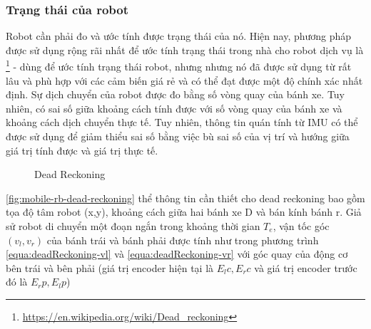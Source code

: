 {\subsubsection*{Trạng thái của robot}
Robot cần phải đo và ước tính được trạng thái của nó. Hiện nay, phương pháp được sử dụng rộng rãi nhất để ước tính trạng thái trong nhà cho robot dịch vụ là \footnote{\url{https://en.wikipedia.org/wiki/Dead_reckoning}} - dùng để ước tính trạng thái robot, nhưng nhưng nó đã được sử dụng từ rất lâu và phù hợp với các cảm biến giá rẻ và có thể đạt được một độ chính xác nhất định. Sự dịch chuyển của robot được đo bằng số vòng quay của bánh xe. Tuy nhiên, có sai số giữa khoảng cách tính được với số vòng quay của bánh xe và khoảng cách dịch chuyển thực tế. Tuy nhiên, thông tin quán tính từ IMU có thể được sử dụng để giảm thiểu sai số bằng việc bù sai số của vị trí và hướng giữa giá trị tính được và giá trị thực tế.

\begin{figure}
\centering
{}
  \caption{Dead Reckoning}
  \label{fig:deadReckoning}
\end{figure}

\figurename{ \ref{fig:mobile-rb-dead-reckoning}} thể thông tin cần thiết cho dead reckoning
bao gồm tọa độ tâm robot (x,y), khoảng cách giữa hai bánh xe D và bán kính bánh r.
Giả sử robot di chuyển một đoạn ngắn trong khoảng thời gian ${T}_{e}$, vận tốc góc $({v}_{l}, {v}_{r})$ của bánh trái và bánh phải được tính như trong phương trình \ref{equa:deadReckoning-vl} và \ref{equa:deadReckoning-vr} với góc quay của động cơ bên trái và bên phải (giá trị encoder hiện tại là ${E}_{l}c, {E}_{r}c$ và giá trị encoder trước đó là ${E}_{r}p, {E}_{l}p$)

}
